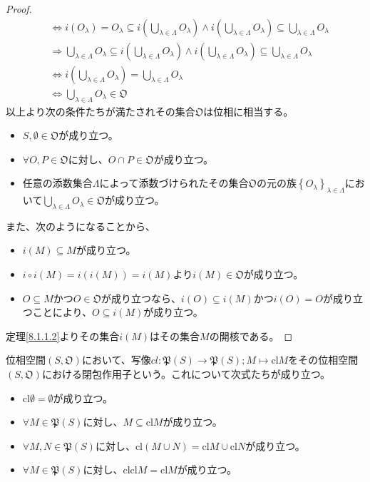 \documentclass[dvipdfmx]{jsarticle}
\begin{document}
\begin{proof}
\begin{align*}
&\Leftrightarrow i\left( O_{\lambda} \right) = O_{\lambda} \subseteq i\left( \bigcup_{\lambda \in \varLambda} O_{\lambda} \right) \land i\left( \bigcup_{\lambda \in \varLambda} O_{\lambda} \right) \subseteq \bigcup_{\lambda \in \varLambda} O_{\lambda}\\
&\Rightarrow \bigcup_{\lambda \in \varLambda} O_{\lambda} \subseteq i\left( \bigcup_{\lambda \in \varLambda} O_{\lambda} \right) \land i\left( \bigcup_{\lambda \in \varLambda} O_{\lambda} \right) \subseteq \bigcup_{\lambda \in \varLambda} O_{\lambda}\\
&\Leftrightarrow i\left( \bigcup_{\lambda \in \varLambda} O_{\lambda} \right) = \bigcup_{\lambda \in \varLambda} O_{\lambda}\\
&\Leftrightarrow \bigcup_{\lambda \in \varLambda} O_{\lambda}\in \mathfrak{O}
\end{align*}
以上より次の条件たちが満たされその集合$\mathfrak{O}$は位相に相当する。
\begin{itemize}
\item
  $S,\emptyset \in \mathfrak{O}$が成り立つ。
\item
  $\forall O,P \in \mathfrak{O}$に対し、$O \cap P \in \mathfrak{O}$が成り立つ。
\item
  任意の添数集合$\varLambda$によって添数づけられたその集合$\mathfrak{O}$の元の族$\left\{ O_{\lambda} \right\}_{\lambda \in \varLambda}$において$\bigcup_{\lambda \in \varLambda} O_{\lambda}\in \mathfrak{O}$が成り立つ。
\end{itemize}\par
また、次のようになることから、
\begin{itemize}
\item
  $i(M) \subseteq M$が成り立つ。
\item
  $i \circ i(M) = i\left( i(M) \right) = i(M)$より$i(M)\in \mathfrak{O}$が成り立つ。
\item
  $O \subseteq M$かつ$O \in \mathfrak{O}$が成り立つなら、$i(O) \subseteq i(M)$かつ$i(O) = O$が成り立つことにより、$O \subseteq i(M)$が成り立つ。
\end{itemize}
定理\ref{8.1.1.2}よりその集合$i(M)$はその集合$M$の開核である。
\end{proof}
\begin{thm}\label{8.1.1.13}
位相空間$\left( S,\mathfrak{O} \right)$において、写像$cl\mathfrak{:P}(S)\mathfrak{\rightarrow P}(S);M \mapsto {\mathrm{cl}}M$をその位相空間$\left( S,\mathfrak{O} \right)$における閉包作用子という。これについて次式たちが成り立つ。
\begin{itemize}
\item
  ${\mathrm{cl}}\emptyset = \emptyset$が成り立つ。
\item
  $\forall M\in \mathfrak{P}(S)$に対し、$M \subseteq {\mathrm{cl}}M$が成り立つ。
\item
  $\forall M,N\in \mathfrak{P}(S)$に対し、${\mathrm{cl}}(M \cup N) = {\mathrm{cl}}M \cup {\mathrm{cl}}N$が成り立つ。
\item
  $\forall M\in \mathfrak{P}(S)$に対し、${\mathrm{cl}}{{\mathrm{cl}}M} = {\mathrm{cl}}M$が成り立つ。
\end{itemize}
\end{thm}\par
\end{document}
